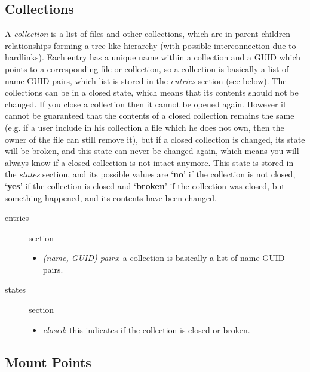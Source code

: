 \documentclass{book}
\begin{document}
\subsection{Collections} %
\label{sub:collections}

A \emph{collection} is a list of files and other collections, which are in parent-children relationships forming a tree-like hierarchy (with possible interconnection due to hardlinks). Each entry has a unique name within a collection and a GUID which points to a corresponding file or collection, so a collection is basically a list of name-GUID pairs, which list is stored in the \emph{entries} section (see below). The collections can be in a closed state, which means that its contents should not be changed. If you close a collection then it cannot be opened again. However it cannot be guaranteed that the contents of a closed collection remains the same (e.g. if a user include in his collection a file which he does not own, then the owner of the file can still remove it), but if a closed collection is changed, its state will be broken, and this state can never be changed again, which means you will always know if a closed collection is not intact anymore. This state is stored in the \emph{states} section, and its possible values are `\textbf{no}' if the collection is not closed, `\textbf{yes}' if the collection is closed and `\textbf{broken}' if the collection was closed, but something happened, and its contents have been changed.

\begin{description}
    \item [entries] section 
    \begin{itemize}
        \item \emph{(name, GUID) pairs}: a collection is basically a list of name-GUID pairs. 
    \end{itemize}
    \item [states] section 
    \begin{itemize}
        \item \emph{closed}: this indicates if the collection is closed or broken. 
    \end{itemize}
\end{description}


\subsection{Mount Points} %
\label{sub:mount_points}
\end{document}
